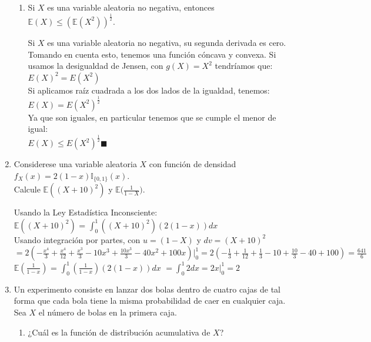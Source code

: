 \documentclass[12pt,a4paper]{report}
\begin{document}
\begin{enumerate}
{\begin{enumerate}
{				}

				\item {
					Si $X$ es una variable aleatoria no negativa, entonces
					$\mathbb{E}(X) \leq (\mathbb{E}(X^2))^{\frac{1}{2}}$.

					Si $X$ es una variable aleatoria no negativa, su segunda derivada es cero. Tomando en cuenta esto, tenemos una función cóncava y convexa. Si usamos la desigualdad de Jensen, con $g(X) = X^2$ tendríamos que:\\

					$E(X)^2 = E(X^2)$\\

					Si aplicamos raíz cuadrada a los dos lados de la igualdad, tenemos:\\
					$E(X) = E(X^2)^{\frac{1}{2}}$\\

					Ya que son iguales, en particular tenemos que se cumple el menor de igual:\\
					$E(X) \leq E(X^2)^{\frac{1}{2}}\blacksquare$

				}
			\end{enumerate}
		}

		\item{
			Considerese una variable aleatoria $X$ con función de densidad
			$f_X(x) = 2(1-x)\mathbb{I}_{\{0, 1\}}(x)$.\\
			Calcule $\mathbb{E}((X+10)^2)$ y
			$\mathbb{E}\Big(\frac{1}{1-X}\Big)$.

			Usando la Ley Estadística Inconsciente:\\

			$\mathbb{E}((X+10)^2)$ = $\int_{0}^{1}((X+10)^2)(2(1-x))dx$\\
			Usando integración por partes, con $u = (1-X)$ y $dv = (X+10)^2$\\
			$= 2(-\frac{x^4}{3} + \frac{x^4}{12} + \frac{x^3}{3} - 10x^3 + \frac{10x^3}{3} - 40x^2 + 100x)\Big|_{0}^{1} = 2(-\frac{1}{3} + \frac{1}{12} + \frac{1}{3} - 10 + \frac{10}{3} - 40 + 100) = \frac{641}{6}$\\

			$\mathbb{E}(\frac{1}{1-x})$ = $\int_{0}^{1}(\frac{1}{1-x})(2(1-x))dx$
			$= \int_{0}^{1}2dx = 2x\Big|_{0}^{1} = 2$\\

		}

		\item{
			Un experimento consiste en lanzar dos bolas dentro de cuatro cajas
			de tal forma que cada bola tiene la misma probabilidad de caer en
			cualquier caja. Sea $X$ el número de bolas en la primera caja.
			\begin{enumerate}
				\item {
					¿Cuál es la función de distribución acumulativa de $X$?

}
\end{enumerate}}
\end{enumerate}
\end{document}
